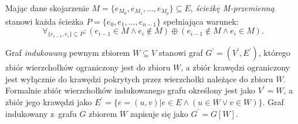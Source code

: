 \begin{definition}
  Mając dane skojarzenie ${M=\{e_{M_0}, e_{M_1}, \ldots, e_{M_p}\} \subseteq E}$,
  \emph{ścieżkę M-przemienną} stanowi każda ścieżka $P=\{e_0, e_1, \ldots, e_{n-1}\}$ spełniająca warunek: 
  \[\forall_{\{e_{i-1}, e_i\} \subseteq P}: (e_{i-1} \in M \land e_i \notin M) \oplus  (e_{i-1} \notin M \land e_i \in M).\]
\end{definition}

\begin{definition}
  Graf \emph{indukowany} pewnym zbiorem $W \subseteq V$ stanowi graf $G^\prime=(V^\prime, E^\prime)$, którego zbiór wierzchołków ograniczony jest do zbioru $W$, a zbiór krawędzi ograniczony jest wyłącznie do krawędzi pokrytych przez wierzchołki należące do zbioru $W$.
  Formalnie zbiór wierzchołków indukowanego grafu określony jest jako $V^\prime = W$, a zbiór jego krawędzi jako $E^\prime=\{e=(u,v)|e\in E \land (u \in W \lor v \in W)\}$.
  Graf indukowany z~grafu $G$ zbiorem $W$ zapisuje się jako $G^\prime = G[W]$.
\end{definition}
